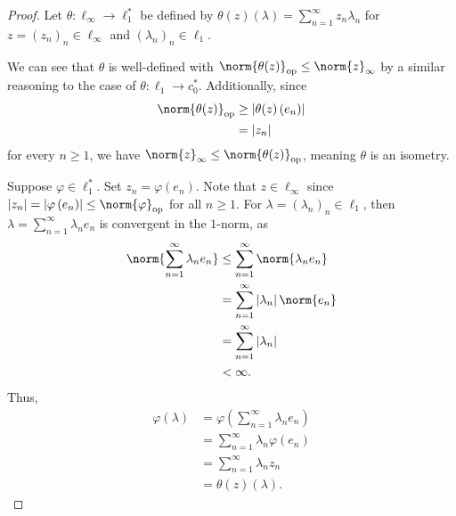 \documentclass[10pt]{mypackage}
\begin{document}
\begin{proof}
  Let $\theta: \ell_{\infty}\rightarrow \ell_1^{\ast}$ be defined by $\theta\left(z\right)\left(\lambda\right) = \sum_{n=1}^{\infty}z_n\lambda_n$ for $z = \left(z_n\right)_n\in \ell_{\infty}$ and $\left(\lambda_n\right)_n\in \ell_1$.\newline

  We can see that $\theta$ is well-defined with $\norm{\theta(z)}_{\text{op}}\leq \norm{z}_{\infty}$ by a similar reasoning to the case of $\theta: \ell_1\rightarrow c_0^{\ast}$. Additionally, since
  \begin{align*}
    \norm{\theta(z)}_{\text{op}} &\geq \left\vert \theta(z)\left(e_n\right) \right\vert\\
                                 &= \left\vert z_n \right\vert
  \end{align*}
  for every $n\geq 1$, we have $\norm{z}_{\infty}\leq \norm{\theta(z)}_{\text{op}}$, meaning $\theta$ is an isometry.\newline

  Suppose $\varphi\in \ell_1^{\ast}$. Set $z_n = \varphi\left(e_n\right)$. Note that $z\in \ell_{\infty}$ since $\left\vert z_n \right\vert = \left\vert \varphi\left(e_n\right) \right\vert \leq \norm{\varphi}_{\text{op}}$ for all $n\geq 1$. For $\lambda = \left(\lambda_n\right)_n\in \ell_1$, then $\lambda = \sum_{n=1}^{\infty}\lambda_ne_n$ is convergent in the $1$-norm, as
  \begin{align*}
    \norm{\sum_{n=1}^{\infty}\lambda_ne_n} &\leq \sum_{n=1}^{\infty}\norm{\lambda_ne_n}\\
                                           &= \sum_{n=1}^{\infty}\left\vert \lambda_n \right\vert\norm{e_n}\\
                                           &= \sum_{n=1}^{\infty}\left\vert \lambda_n \right\vert\\
                                           &< \infty.
  \end{align*}
  Thus, 
  \begin{align*}
    \varphi\left(\lambda\right) &= \varphi\left(\sum_{n=1}^{\infty}\lambda_ne_n\right)\\
                                &= \sum_{n=1}^{\infty}\lambda_n\varphi\left(e_n\right)\\
                                &= \sum_{n=1}^{\infty}\lambda_nz_n\\
                                &= \theta\left(z\right)\left(\lambda\right).
  \end{align*}
\end{proof}
\end{document}

